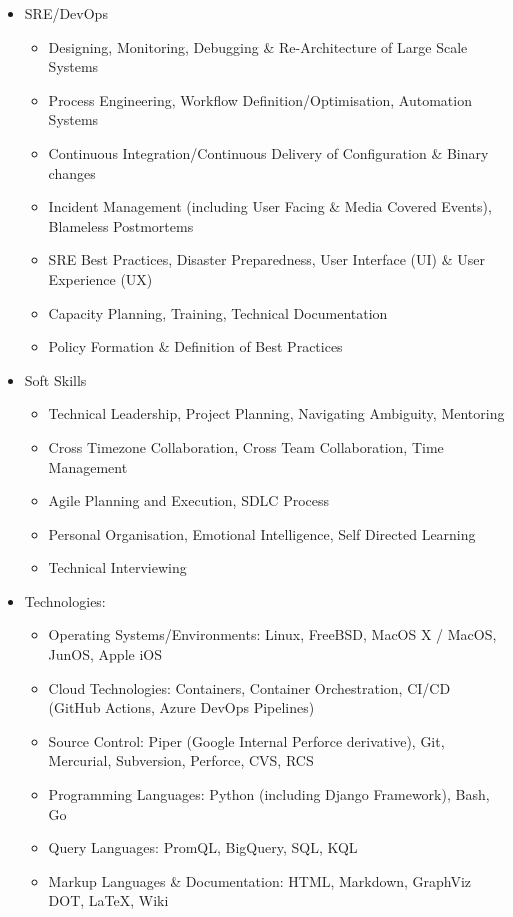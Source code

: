 \documentclass[a4paper, 10pt] {article}
\begin{document}
\begin{itemize}[noitemsep]
\item SRE/DevOps
  \begin{itemize}[noitemsep]
  \item Designing, Monitoring, Debugging \& Re-Architecture of Large Scale Systems
  \item Process Engineering, Workflow Definition/Optimisation, Automation Systems
  \item Continuous Integration/Continuous Delivery of Configuration \& Binary changes
  \item Incident Management (including User Facing \& Media Covered Events), Blameless Postmortems
  \item SRE Best Practices, Disaster Preparedness, User Interface (UI) \& User Experience (UX)
  \item Capacity Planning, Training, Technical Documentation
  \item Policy Formation \& Definition of Best Practices
  \end{itemize}
\item Soft Skills
  \begin{itemize}[noitemsep]
  \item Technical Leadership, Project Planning, Navigating Ambiguity, Mentoring
  \item Cross Timezone Collaboration, Cross Team Collaboration, Time Management
  \item Agile Planning and Execution, SDLC Process
  \item Personal Organisation, Emotional Intelligence, Self Directed Learning
  \item Technical Interviewing
  \end{itemize}
\item Technologies:
  \begin{itemize}[noitemsep]
  \item Operating Systems/Environments: Linux, FreeBSD, MacOS X / MacOS, JunOS, Apple iOS
  \item Cloud Technologies: Containers, Container Orchestration, CI/CD (GitHub Actions, Azure DevOps Pipelines)
  \item Source Control: Piper (Google Internal Perforce derivative), Git, Mercurial, Subversion, Perforce, CVS, RCS
  \item Programming Languages: Python (including Django Framework), Bash, Go
  \item Query Languages: PromQL, BigQuery, SQL, KQL
  \item Markup Languages \& Documentation: HTML, Markdown, GraphViz DOT, \LaTeX, Wiki
  \end{itemize}
\end{itemize}  
\end{document}
